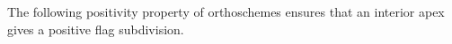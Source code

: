 \documentclass[11pt]{article}
\newcommand{\R}{\mathbb{R}}
\newcommand{\eps}{\varepsilon}
\DeclareMathOperator{\diag}{diag}
\newtheorem{remark}[theorem]{Remark}
\begin{document}


The following positivity property of orthoschemes ensures that an interior
apex gives a positive flag subdivision.
\end{document}
